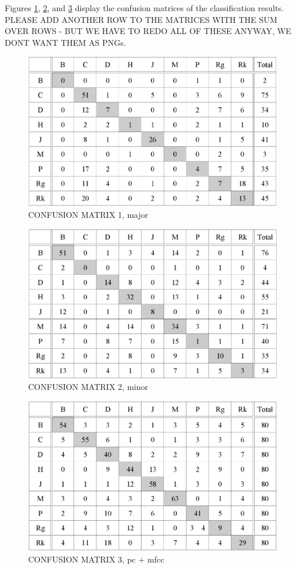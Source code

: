 \documentclass{article}
\begin{document}
Figures \ref{fig:confMatMajPC}, \ref{fig:confMatMinPC}, and \ref{fig:confPC+MFCC} display the confusion matrices of the classification results. PLEASE ADD ANOTHER ROW TO THE MATRICES WITH THE SUM OVER ROWS - BUT WE HAVE TO REDO ALL OF THESE ANYWAY, WE DONT WANT THEM AS PNGs.
\begin{figure}[tb]
    \includegraphics[scale=.4]{graph/confMatMajPC}
	\caption{CONFUSION MATRIX 1, major}
	\label{fig:confMatMajPC}
\end{figure}
\begin{figure}[tb]
    \includegraphics[scale=.4]{graph/confMatMinPC}
	\caption{CONFUSION MATRIX 2, minor}
	\label{fig:confMatMinPC}
\end{figure}
\begin{figure}[tb]
    \includegraphics[scale=.4]{graph/confPC+MFCC}
	\caption{CONFUSION MATRIX 3, pc + mfcc}
	\label{fig:confPC+MFCC}
\end{figure}
\end{document}
